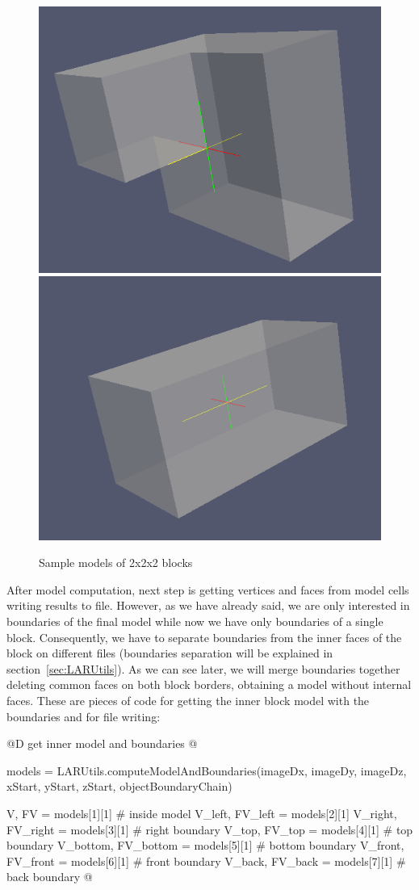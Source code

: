 \documentclass[11pt,oneside]{article}	%
\begin{document}
\begin{figure}[htb] %
   \centering
   \includegraphics[width=0.45\linewidth]{images/sampleBlock1.png} \hfill
   \includegraphics[width=0.45\linewidth]{images/sampleBlock2.png}
   \caption{Sample models of 2x2x2 blocks}
   \label{fig:sampleBlocks}
\end{figure}

After model computation, next step is getting vertices and faces from model cells writing results to file. However, as we have already said, we are only interested in boundaries of the final model while now we have only boundaries of a single block. Consequently, we have to separate boundaries from the inner faces of the block on different files (boundaries separation will be explained in section~\ref{sec:LARUtils}). As we can see later, we will merge boundaries together deleting common faces on both block borders, obtaining a model without internal faces. These are pieces of code for getting the inner block model with the boundaries and for file writing:

@D get inner model and boundaries
@{models = LARUtils.computeModelAndBoundaries(imageDx, imageDy, imageDz,
					    xStart, yStart, zStart, objectBoundaryChain)

V, FV = models[1][1] # inside model
V_left, FV_left = models[2][1]
V_right, FV_right = models[3][1] # right boundary
V_top, FV_top = models[4][1] # top boundary
V_bottom, FV_bottom = models[5][1] # bottom boundary
V_front, FV_front = models[6][1] # front boundary
V_back, FV_back = models[7][1] # back boundary
@}
\end{document}
